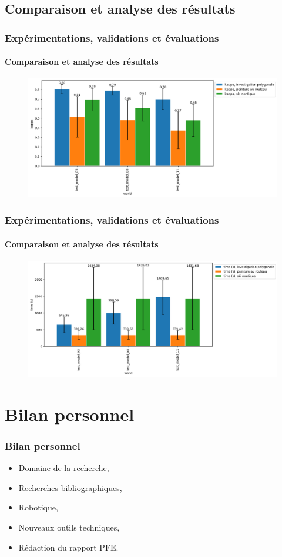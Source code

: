 \documentclass{beamer}
\begin{document}
		\subsection{Comparaison et analyse des résultats}
			\begin{frame}
				\frametitle{Expérimentations, validations et évaluations}
				\framesubtitle{Comparaison et analyse des résultats}
				\begin{figure}[H]
					\includegraphics[width=\linewidth]{graphics/investigation_polygonale-peinture_au_rouleau_ski_nordique-kappa_for_each_world_vs_investigation_polygonale-kappa_for_each_world.png}
				\end{figure}
			\end{frame}
			\begin{frame}
				\frametitle{Expérimentations, validations et évaluations}
				\framesubtitle{Comparaison et analyse des résultats}
				\begin{figure}[H]
					\includegraphics[width=\linewidth]{graphics/investigation_polygonale-peinture_au_rouleau_ski_nordique-time_for_each_world_vs_investigation_polygonale-time_for_each_world.png}
				\end{figure}
			\end{frame}
	\section{Bilan personnel}
		\begin{frame}
			\frametitle{Bilan personnel}
			\begin{itemize}
				\item Domaine de la recherche,
				\item Recherches bibliographiques,
				\item Robotique,
				\item Nouveaux outils techniques,
				\item Rédaction du rapport PFE.
			\end{itemize}
		\end{frame}
\end{document}
